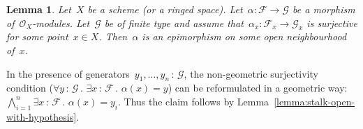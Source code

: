 \documentclass[10pt,reqno,a4paper]{amsbook}
\makeatletter
\theoremstyle{definition}
\theoremstyle{plain}
\newtheorem{lemma}[defn]{Lemma}
\theoremstyle{remark}
\newcommand{\F}{\mathcal{F}}
\renewcommand{\G}{\mathcal{G}}
\renewcommand{\O}{\mathcal{O}}
\newcommand{\?}{\,{:}\,}
\renewcommand{\_}{\mathpunct{.}\,}
\renewenvironment{proof}[1][\proofname]{\par
  \pushQED{\qed}%
  \normalfont \topsep6\p@\@plus6\p@\relax
  \trivlist
  \item[\hskip\labelsep
        \itshape
    #1\@addpunct{.}]\ignorespaces
}{%
  \popQED\endtrivlist\@endpefalse
}
\makeatother
\begin{document}
\begin{lemma}Let~$X$ be a scheme (or a ringed space). Let~$\alpha : \F \to \G$ be
a morphism of~$\O_X$-modules. Let~$\G$ be of finite type and assume
that~$\alpha_x : \F_x \to \G_x$ is surjective for some point~$x \in X$.
Then~$\alpha$ is an epimorphism on some open neighbourhood of~$x$.\end{lemma}
\begin{proof}In the presence of generators~$y_1,\ldots,y_n\?\G$, the
non-geometric surjectivity condition ($\forall y\?\G\_ \exists x\?\F\_
\alpha(x) = y$) can be reformulated in a geometric way: $\bigwedge_{i=1}^n
\exists x\?\F\_ \alpha(x) = y_i$. Thus the claim follows by
Lemma~\ref{lemma:stalk-open-with-hypothesis}.\end{proof}

\end{document}
